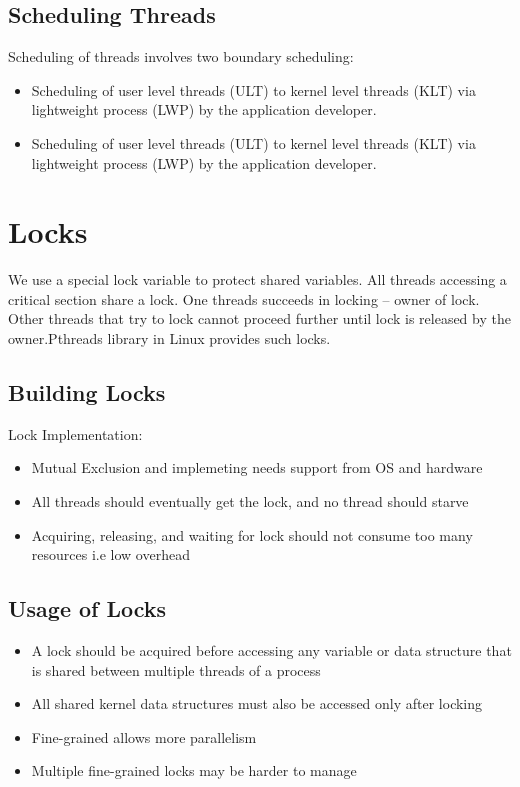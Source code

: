 \documentclass{article}
\begin{document}
\subsection{Scheduling Threads}
Scheduling of threads involves two boundary scheduling:
\begin{itemize}
    \item Scheduling of user level threads (ULT) to kernel level threads (KLT) via lightweight process (LWP) by the application developer.
    \item Scheduling of user level threads (ULT) to kernel level threads (KLT) via lightweight process (LWP) by the application developer.
\end{itemize}
\section{Locks}
We use a special lock variable to protect shared variables. All threads accessing a critical section share a lock. One threads succeeds in locking – owner of lock. Other threads that try to lock cannot proceed further until lock is released by the owner.Pthreads library in Linux provides such locks.
\subsection{Building Locks}
Lock Implementation:
\begin{itemize}
    \item Mutual Exclusion and implemeting needs support from OS and hardware
    \item All threads should eventually get the lock, and no thread should starve
    \item Acquiring, releasing, and waiting for lock should not consume too many resources i.e low overhead
\end{itemize}
\subsection{Usage of Locks}
\begin{itemize}
    \item A lock should be acquired before accessing any variable or data structure that is shared between multiple threads of a process
    \item All shared kernel data structures must also be accessed only after locking
    \item Fine-grained allows more parallelism
    \item Multiple fine-grained locks may be harder to manage
\end{itemize}
\end{document}
